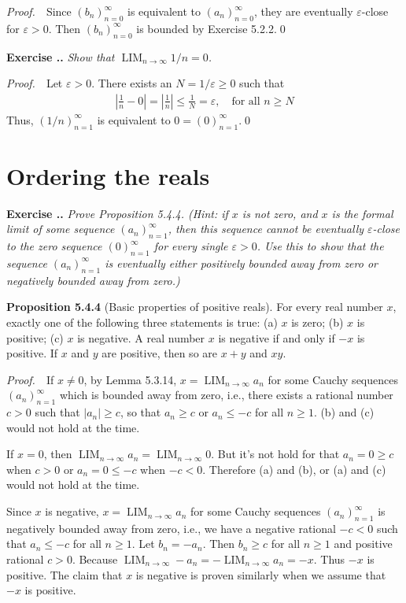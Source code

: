 \documentclass{book}
\DeclareMathOperator{\tlim}{LIM}%
\newcommand{\pff}{\vspace{.25em}\noindent\emph{Proof.}~~}
\newcommand{\titl}[1]{\noindent\textbf{#1}}
\newcounter{Exercise}[section]
\renewcommand{\theExercise}{\thesection.\arabic{Exercise}.}
\newcommand{\new}{\vspace{1.5em}\noindent\textbf{{Exercise \stepcounter{Exercise}\textbf{\theExercise}}} }
\begin{document}
\pff Since $(b_n)_{n=0}^\infty$ is equivalent to $(a_n)_{n=0}^\infty$, they are eventually $\varepsilon$-close for $\varepsilon>0$. Then $(b_n)_{n=0}^\infty$ is bounded by Exercise 5.2.2.\qed

\new\emph{Show that $\tlim_{n\to\infty}1/n=0$.}

\pff Let $\varepsilon>0$. There exists an $N=1/\varepsilon\geq 0$ such that
    \begin{align*}
        |\frac{1}{n}-0|=|\frac{1}{n}|\leq\frac{1}{N}=\varepsilon,\quad\text{for all }n\geq N
    \end{align*}
Thus, $(1/n)_{n=1}^\infty$ is equivalent to $0=(0)_{n=1}^\infty$.\qed

\section{Ordering the reals}

\new\emph{Prove Proposition 5.4.4. (Hint: if $x$ is not zero, and $x$ is the formal limit of some sequence $(a_n)_{n=1}^\infty$, then this sequence cannot be eventually $\varepsilon$-close to the zero sequence $(0)_{n=1}^\infty$ for every single $\varepsilon>0$. Use this to show that the sequence $(a_n)_{n=1}^\infty$ is eventually either positively bounded away from zero or negatively bounded away from zero.)}

\begin{framed}
\titl{Proposition 5.4.4} (Basic properties of positive reals). For every real number $x$, exactly one of the following three statements is true: (a) $x$ is zero; (b) $x$ is positive; (c) $x$ is negative. A real number $x$ is negative if and only if $-x$ is positive. If $x$ and $y$ are positive, then so are $x+y$ and $xy$.
\end{framed}

\pff If $x\ne0$, by Lemma 5.3.14, $x=\tlim_{n\to\infty}a_n$ for some Cauchy sequences $(a_n)_{n=1}^\infty$ which is bounded away from zero, i.e., there exists a rational number $c>0$ such that $|a_n|\geq c$, so that $a_n\geq c$ or $a_n\leq -c$ for all $n\geq 1$. (b) and (c) would not hold at the time.

If $x=0$, then $\tlim_{n\to\infty}a_n=\tlim_{n\to\infty}0$. But it's not hold for that $a_n=0\geq c$ when $c>0$ or $a_n=0\leq-c$ when $-c<0$. Therefore (a) and (b), or (a) and (c) would not hold at the time.

Since $x$ is negative, $x=\tlim_{n\to\infty}a_n$ for some Cauchy sequences $(a_n)_{n=1}^\infty$ is negatively bounded away from zero, i.e., we have a negative rational $-c<0$ such that $a_n\leq-c$ for all $n\geq 1$. Let $b_n=-a_n$. Then $b_n\geq c$ for all $n\geq 1$ and positive rational $c>0$. Because $\tlim_{n\to\infty}-a_n=-\tlim_{n\to\infty}a_n=-x$. Thus $-x$ is positive. The claim that $x$ is negative is proven similarly when we assume that $-x$ is positive.
\end{document}
